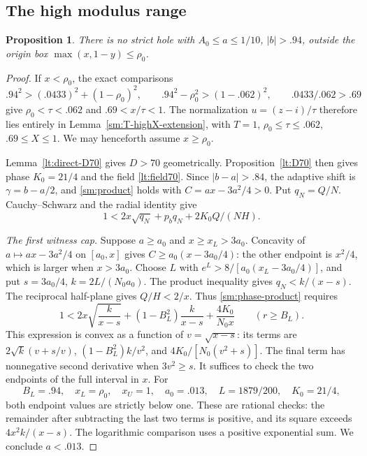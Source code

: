 \documentclass[11pt,reqno]{amsart}
\numberwithin{equation}{section}
\newtheorem{proposition}[theorem]{Proposition}
\theoremstyle{definition}
\theoremstyle{remark}
\begin{document}
\subsection{The high modulus range}

\begin{proposition}\label{sm:high}
There is no strict hole with $A_0\le a\le1/10$, $|b|>.94$,
outside the origin box $\max(x,1-y)\le\rho_0$.
\end{proposition}
\begin{proof}
If $x<\rho_0$, the exact comparisons
\[
 .94^2>(.0433)^2+(1-\rho_0)^2,\qquad
 .94^2-\rho_0^2>(1-.062)^2,\qquad .0433/.062>.69
\]
give $\rho_0<\tau<.062$ and $.69<x/\tau<1$.
The normalization $u=(z-i)/\tau$ therefore lies entirely in
Lemma~\ref{sm:T-highX-extension}, with $T=1$,
$\rho_0\le\tau\le.062$, $.69\le X\le1$.
We may henceforth assume $x\ge\rho_0$.

Lemma~\ref{lt:direct-D70} gives $D>70$ geometrically.
Proposition~\ref{lt:D70} then gives phase $K_0=21/4$ and the
field \eqref{lt:field70}. Since $|b-a|>.84$, the adaptive shift
is $\gamma=b-a/2$, and \eqref{sm:product} holds with
$C=ax-3a^2/4>0$.
Put $q_N=Q/N$. Cauchy--Schwarz and the radial identity give
\begin{equation}\label{sm:phase-product}
 1<2x\sqrt{q_N}+p_bq_N+2K_0Q/(NH).
\end{equation}

\smallskip\noindent\emph{The first witness cap.}
Suppose $a\ge a_0$ and $x\ge x_L>3a_0$. Concavity of
$a\mapsto ax-3a^2/4$ on $[a_0,x]$ gives
$C\ge a_0(x-3a_0/4)$: the other endpoint is $x^2/4$, which
is larger when $x>3a_0$.
Choose $L$ with $e^L>8/[a_0(x_L-3a_0/4)]$, and put
$s=3a_0/4$, $k=2L/(N_0a_0)$.
The product inequality gives $q_N<k/(x-s)$.
The reciprocal half-plane gives $Q/H<2/x$.
Thus \eqref{sm:phase-product} requires
\begin{equation}\label{sm:initial-cap-function}
 1<2x\sqrt{\frac{k}{x-s}}+
       (1-B_L^2)\frac{k}{x-s}+\frac{4K_0}{N_0x}
       \qquad(r\ge B_L).
\end{equation}
This expression is convex as a function of $v=\sqrt{x-s}$:
its terms are $2\sqrt k(v+s/v)$,
$(1-B_L^2)k/v^2$, and $4K_0/[N_0(v^2+s)]$.
The final term has nonnegative second derivative when $3v^2\ge s$.
It suffices to check the two endpoints of the full interval in $x$.
For
\[
 B_L=.94,\quad x_L=\rho_0,\quad x_U=1,\quad
 a_0=.013,\quad L=1879/200,\quad K_0=21/4,
\]
both endpoint values are strictly below one. These are rational
checks: the remainder after subtracting the last two terms is
positive, and its square exceeds $4x^2k/(x-s)$.
The logarithmic comparison uses a positive exponential sum.
We conclude $a<.013$.


\end{proof}
\end{document}
